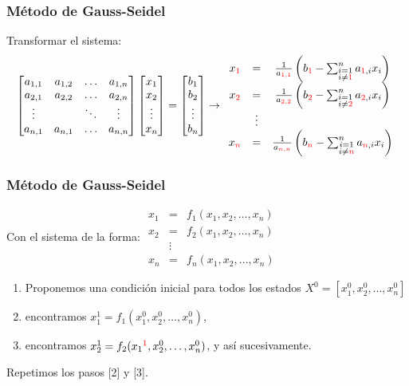 \documentclass[xcolor=svgnames]{beamer} %
\theoremstyle{plain}
\theoremstyle{definition}
\begin{document}
\begin{frame}
\frametitle{Método de Gauss-Seidel}

Transformar el sistema:
{\small $$ \begin{bmatrix}
a_{1,1} & a_{1,2} 	& \dots 	 	& a_{1,n} \\
a_{2,1} & a_{2,2} 	& \dots	 	& a_{2,n} \\
\vdots 	& 		  	& \ddots	 	& \vdots \\
a_{n,1}	& a_{n,1} 	& \dots 		& a_{n,n}
\end{bmatrix} \begin{bmatrix}
x_1\\
x_2\\
\vdots\\
x_n
\end{bmatrix} =\begin{bmatrix}
b_1\\
b_2\\
\vdots\\
b_n
\end{bmatrix} \rightarrow \displaystyle \begin{array}{ccc}
x_{\color{red}1} & =& \frac{1}{a_{{\color{red}1,1}}}\left(b_{\color{red}1} - \sum_{\substack{i=1 \\ i\neq{\color{red}1}}}^n  a_{ {\color{red}1},i} x_i \right)\\
x_{\color{red}2} & =& \frac{1}{a_{{\color{red}2,2}}}\left(b_{\color{red}2} - \sum_{\substack{i=1 \\ i\neq{\color{red}2}}}^n  a_{ {\color{red}2},i} x_i\right)\\
 & \vdots & \\
x_{\color{red}n} & =& \frac{1}{a_{{\color{red}n,n}}}\left(b_{\color{red}n} - \sum_{\substack{i=1 \\ i\neq{\color{red}n}}}^n  a_{ {\color{red}n},i} x_i\right)\\
 
\end{array} $$ }

\end{frame}



\begin{frame}
\frametitle{Método de Gauss-Seidel}
Con el sistema de la forma: $\begin{array}{ccc}
x_1 &=& f_1(x_1,x_2,\dots,x_n)\\
x_2 &=& f_2(x_1,x_2,\dots,x_n)\\
&\vdots&\\
x_n &=& f_n(x_1,x_2,\dots,x_n)
\end{array}$
\begin{enumerate} 
\item Proponemos una condición inicial para todos los estados $X^0=[x_1^0,x_2^0,...,x_n^0]$
\item encontramos $x_1^1 = f_1(x_1^0,x_2^0,\dots,x_n^0)$,
\item encontramos $x_2^1 = f_2({x_1}^{\color{red}1},x_2^0,\dots,x_n^0)$, y así sucesivamente.
\end{enumerate}
\pause
Repetimos los pasos [2] y [3]. 

\end{frame}
\end{document}
